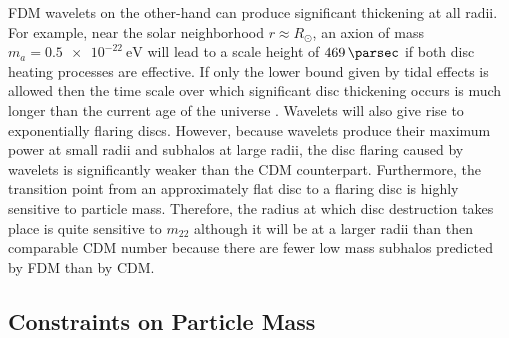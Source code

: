 \documentclass[usenatbib]{mnras}
\begin{document}
FDM wavelets on the other-hand can produce significant thickening at all radii. For example, near the solar neighborhood $r \approx R_{\odot}$, an axion of mass $m_a = \SI{0.5 e-22}{\electronvolt}$ will lead to a scale height of $\SI{469}{\parsec}$ if both disc heating processes are effective. If only the lower bound given by tidal effects is allowed then the time scale over which significant disc thickening occurs is much longer than the current age of the universe \citep{ultralight}. Wavelets will also give rise to exponentially flaring discs. However, because wavelets produce their maximum power at small radii and subhalos at large radii, the disc flaring caused by wavelets is significantly weaker than the CDM counterpart. Furthermore, the transition point from an approximately flat disc to a flaring disc is highly sensitive to particle mass. Therefore, the radius at which disc destruction takes place is quite sensitive to $m_{22}$ although it will be at a larger radii than then comparable CDM number because there are fewer low mass subhalos predicted by FDM than by CDM. 


\subsection{Constraints on Particle Mass}
\end{document}
